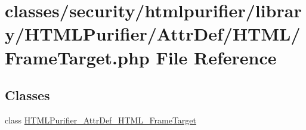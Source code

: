 \hypertarget{FrameTarget_8php}{\section{classes/security/htmlpurifier/library/\+H\+T\+M\+L\+Purifier/\+Attr\+Def/\+H\+T\+M\+L/\+Frame\+Target.php File Reference}
\label{FrameTarget_8php}
}
\subsection*{Classes}
\begin{DoxyCompactItemize}
\item 
class \hyperlink{classHTMLPurifier__AttrDef__HTML__FrameTarget}{H\+T\+M\+L\+Purifier\+\_\+\+Attr\+Def\+\_\+\+H\+T\+M\+L\+\_\+\+Frame\+Target}
\end{DoxyCompactItemize}
